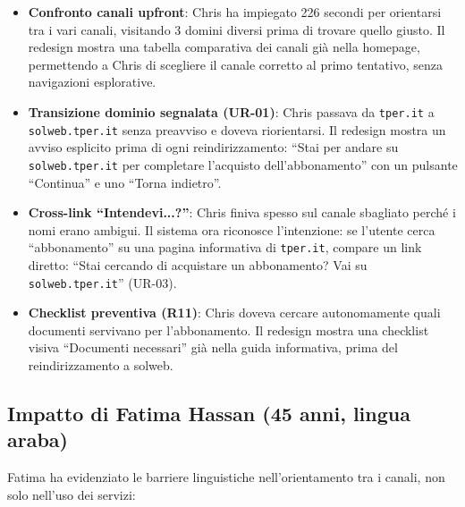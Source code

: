 \documentclass[11pt,a4paper]{article}
\begin{document}
\begin{itemize}
    \item \textbf{Confronto canali upfront}: Chris ha impiegato 226 secondi per orientarsi tra i vari canali, visitando 3 domini diversi prima di trovare quello giusto. Il redesign mostra una tabella comparativa dei canali gi\`a nella homepage, permettendo a Chris di scegliere il canale corretto al primo tentativo, senza navigazioni esplorative.
    \item \textbf{Transizione dominio segnalata (UR-01)}: Chris passava da \texttt{tper.it} a \texttt{solweb.tper.it} senza preavviso e doveva riorientarsi. Il redesign mostra un avviso esplicito prima di ogni reindirizzamento: ``Stai per andare su \texttt{solweb.tper.it} per completare l'acquisto dell'abbonamento'' con un pulsante ``Continua'' e uno ``Torna indietro''.
    \item \textbf{Cross-link ``Intendevi...?''}: Chris finiva spesso sul canale sbagliato perch\'e i nomi erano ambigui. Il sistema ora riconosce l'intenzione: se l'utente cerca ``abbonamento'' su una pagina informativa di \texttt{tper.it}, compare un link diretto: ``Stai cercando di acquistare un abbonamento? Vai su \texttt{solweb.tper.it}'' (UR-03).
    \item \textbf{Checklist preventiva (R11)}: Chris doveva cercare autonomamente quali documenti servivano per l'abbonamento. Il redesign mostra una checklist visiva ``Documenti necessari'' gi\`a nella guida informativa, prima del reindirizzamento a solweb.
\end{itemize}

\subsection{Impatto di Fatima Hassan (45 anni, lingua araba)}

Fatima ha evidenziato le barriere linguistiche nell'orientamento tra i canali, non solo nell'uso dei servizi:
\end{document}
